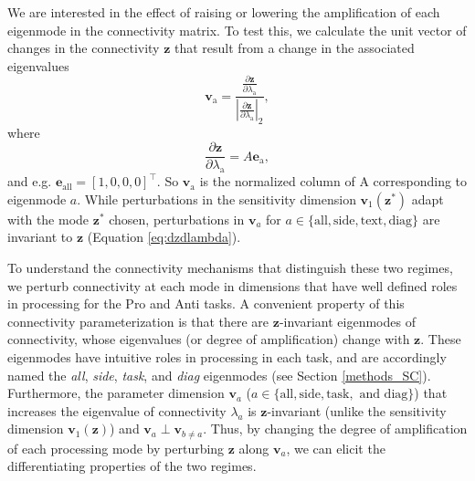\documentclass[11pt]{article}
\begin{document}
We are interested in the effect of raising or lowering the amplification of each eigenmode in the connectivity matrix.
To test this, we calculate the unit vector of changes in the connectivity $\mathbf{z}$ that result from a change in the associated eigenvalues
\begin{equation}
\mathbf{v}_{\text{a}} = \frac{\frac{\partial \mathbf{z}}{\partial \lambda_{\text{a}}}}{|\frac{\partial \mathbf{z}}{\partial \lambda_{\text{a}}}|_2},
\end{equation}
where
\begin{equation} \label{eq:dzdlambda}
\frac{\partial \mathbf{z}}{\partial \lambda_{\text{a}}} = A\mathbf{e}_{\text{a}},
\end{equation}
and e.g. $\mathbf{e}_{\text{all}} = [1, 0, 0, 0]^\top$.
So $\mathbf{v}_{\text{a}}$ is the normalized column of A corresponding to eigenmode $a$.
While perturbations in the sensitivity dimension $\mathbf{v}_1(\mathbf{z}^*)$ adapt with the mode $\mathbf{z}^*$ chosen, perturbations in $\mathbf{v}_a$ for $a \in \{\text{all}, \text{side}, \text{text}, \text{diag}\}$ are invariant to $\mathbf{z}$ (Equation \ref{eq:dzdlambda}).

To understand the connectivity mechanisms that distinguish these two regimes, we perturb connectivity at each mode in dimensions that have well defined roles in processing for the Pro and Anti tasks.
A convenient property of this connectivity parameterization is that there are $\mathbf{z}$-invariant eigenmodes of connectivity, whose eigenvalues (or degree of amplification) change with $\mathbf{z}$.
These eigenmodes have intuitive roles in processing in each task, and are accordingly named the \textit{all}, \textit{side}, \textit{task}, and \textit{diag} eigenmodes (see Section \ref{methods_SC}).
Furthermore, the parameter dimension $\mathbf{v}_a$ ($a \in \{\text{all}, \text{side}, \text{task}, \text{ and diag}\}$) that increases the eigenvalue of connectivity $\lambda_a$ is $\mathbf{z}$-invariant (unlike the sensitivity dimension $\mathbf{v}_1(\mathbf{z})$) and $\mathbf{v}_a \perp \mathbf{v}_{b \neq a}$.
Thus, by changing the degree of amplification of each processing mode by  perturbing $\mathbf{z}$ along $\mathbf{v}_a$, we can elicit the differentiating properties of the two regimes.

%
\end{document}
